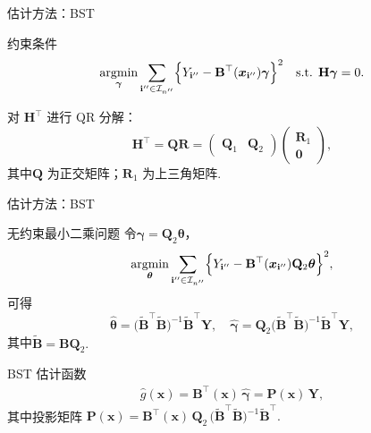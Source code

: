 \documentclass{beamer}
\begin{document}
\begin{frame}{估计方法：BST}
\begin{block}{约束条件}
\begin{align}\label{EQ:RBSTLS}
   \underset{\boldsymbol{\gamma}}{\mathrm{argmin}}\sum_{\mathbf{i}''\in \mathcal{I}_{n''}}
   \Bigl\{Y_{\mathbf{i}''}-\mathbf{B}^{\top}(\boldsymbol{x}_{\mathbf{i}''})\boldsymbol{\gamma}\Bigr\}^2
   \quad\text{s.t. } \mathbf{H}\boldsymbol{\gamma}=0.
\end{align}
\end{block}

对 $\mathbf{H}^\top$ 进行 QR 分解：
\[
\mathbf{H}^\top
= \mathbf{Q}\mathbf{R}
= \begin{pmatrix}\mathbf{Q}_1 & \mathbf{Q}_2\end{pmatrix}
  \begin{pmatrix}\mathbf{R}_1\\ \mathbf{0}\end{pmatrix},
\]
其中$\mathbf{Q}$ 为正交矩阵；$\mathbf{R}_1$ 为上三角矩阵.
\end{frame}

\begin{frame}{估计方法：BST}
\small
\begin{block}{无约束最小二乘问题}
令$\boldsymbol{\gamma} = \mathbf{Q}_2\boldsymbol{\theta}$，
\begin{align}\label{EQ:RRBSTLS}
    \underset{\boldsymbol{\theta}}{\mathrm{argmin}}\sum_{\mathbf{i}''\in \mathcal{I}_{n''}}
   \Bigl\{Y_{\mathbf{i}''}-\mathbf{B}^{\top}(\boldsymbol{x}_{\mathbf{i}''})\mathbf{Q}_2\boldsymbol{\theta}\Bigr\}^2,
\end{align}
可得
\[
\hat{\boldsymbol{\theta}}
= \bigl(\tilde{\mathbf{B}}^\top \tilde{\mathbf{B}}\bigr)^{-1}
  \tilde{\mathbf{B}}^\top \mathbf{Y},
\quad
\hat{\boldsymbol{\gamma}}
= \mathbf{Q}_2
  \bigl(\tilde{\mathbf{B}}^\top \tilde{\mathbf{B}}\bigr)^{-1}
  \tilde{\mathbf{B}}^\top \mathbf{Y},
\]
其中$\tilde{\mathbf{B}}=\mathbf{B}\mathbf{Q}_2.$
\end{block}

\begin{block}{BST 估计函数}
    \begin{align}\label{EQ:BSTghat}
  \hat{g}(\boldsymbol{x})
  = \mathbf{B}^\top(\boldsymbol{x})\,\hat{\boldsymbol{\gamma}}
  = \mathbf{P}(\boldsymbol{x})\,\mathbf{Y},
\end{align}
其中投影矩阵
\(
\mathbf{P}(\boldsymbol{x})
= \mathbf{B}^\top(\boldsymbol{x})\,\mathbf{Q}_2\,
  \bigl(\tilde{\mathbf{B}}^\top \tilde{\mathbf{B}} \bigr)^{-1}
  \tilde{\mathbf{B}}^\top.
\)

\end{block}
\end{frame}
\end{document}
